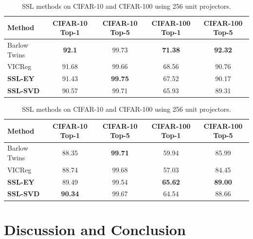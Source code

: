 \begin{table}[h] 
\centering 
\begin{tabular}{lcccc} 
\hline 
Method & CIFAR-10 Top-1 & CIFAR-10 Top-5 & CIFAR-100 Top-1 & CIFAR-100 Top-5 \\ 
\hline 
Barlow Twins & \textbf{92.1} & 99.73 & \textbf{71.38} & \textbf{92.32}\\
VICReg & 91.68	&99.66 & 68.56&	90.76 \\
\textbf{SSL-EY} & 91.43& \textbf{99.75}& 67.52& 90.17\\
\textbf{SSL-SVD} & 90.57 & 99.71 & 65.93 & 89.31 \\
\hline 
\end{tabular} \caption{SSL methods on CIFAR-10 and CIFAR-100 using 2048 unit projectors.} \label{tab:selfsup}
\centering 
\begin{tabular}{lcccc} 
\hline 
Method & CIFAR-10 Top-1 & CIFAR-10 Top-5 & CIFAR-100 Top-1 & CIFAR-100 Top-5 \\ 
\hline 
Barlow Twins & 88.35 & \textbf{99.71} & 59.94 & 85.99 \\
VICReg & 88.74 & 99.68 & 57.03& 84.45 \\
\textbf{SSL-EY} & 89.49 & 99.54 & \textbf{65.62}& \textbf{89.00}\\
\textbf{SSL-SVD} & \textbf{90.34} & 99.67 & 64.54 & 88.66 \\
\hline 
\end{tabular} \caption{SSL methods on CIFAR-10 and CIFAR-100 using 256 unit projectors.} \label{tab:selfsupsmaller} \end{table}

\section{Discussion and Conclusion}





